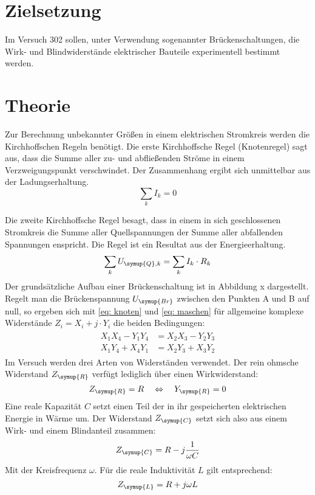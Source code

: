 \section*{Zielsetzung}
Im Versuch 302 sollen, unter Verwendung sogenannter Brückenschaltungen, die Wirk- und Blindwiderstände
 elektrischer Bauteile experimentell bestimmt werden.
\section{Theorie}
Zur Berechnung unbekannter Größen in einem elektrischen Stromkreis werden die Kirchhoffschen Regeln
benötigt. Die erste Kirchhoffsche Regel (Knotenregel) sagt aus, dass die Summe aller zu- und abfließenden
Ströme in einem Verzweigungspunkt verschwindet. Der Zusammenhang ergibt sich unmittelbar aus der Ladungserhaltung.
\begin{equation}
  \sum_k I_k = 0
  \label{eq: knoten}
\end{equation}

Die zweite Kirchhoffsche Regel besagt, dass in einem in sich geschlossenen Stromkreis
die Summe aller Quellspannungen der Summe aller abfallenden
Spannungen enspricht. Die Regel ist ein Resultat aus der Energieerhaltung.
\begin{equation}
  \sum_k U_{\symup{Q},k} = \sum_k I_k \cdot R_k
  \label{eq: maschen}
\end{equation}
Der grundsätzliche Aufbau einer Brückenschaltung ist in Abbildung x dargestellt. Regelt man die Brückenspannung $U_{\symup{Br}}$
zwischen den Punkten A und B auf null, so ergeben sich mit \eqref{eq: knoten} und \eqref{eq: maschen}
für allgemeine komplexe Widerstände $Z_i = X_i + j \cdot Y_i$ die
beiden Bedingungen:
\begin{align}
  \begin{aligned}
    X_1 X_4 - Y_1 Y_4 &= X_2 X_3 - Y_2 Y_3 \\
    X_1 Y_4 + X_4 Y_1 &= X_2 Y_3 + X_3 Y_2
  \end{aligned}
  \label{eq: widerstandsbedingungen}
\end{align}
Im Versuch werden drei Arten von Widerständen verwendet. Der rein ohmsche Widerstand
$Z_{\symup{R}}$ verfügt lediglich über einen Wirkwiderstand:
\begin{equation}
 Z_{\symup{R}} = R \quad \Leftrightarrow \quad Y_{\symup{R}} = 0
\end{equation}
Eine reale Kapazität $C$ setzt einen Teil der in ihr gespeicherten elektrischen Energie
in Wärme um. Der Widerstand $Z_{\symup{C}}$ setzt sich also aus einem Wirk- und einem Blindanteil zusammen:
\begin{equation}
  Z_{\symup{C}} = R - j \frac{1}{\omega C}
\end{equation}
Mit der Kreisfrequenz $\omega$. Für die reale Induktivität $L$ gilt entsprechend:
\begin{equation}
  Z_{\symup{L}} = R + j \omega L 
\end{equation}
